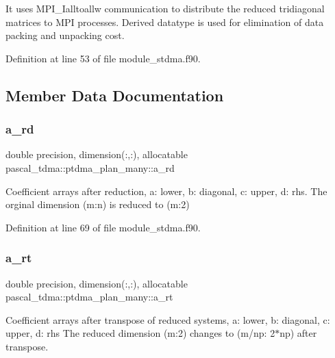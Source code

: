 It uses M\+P\+I\+\_\+\+Ialltoallw communication to distribute the reduced tridiagonal matrices to M\+PI processes. Derived datatype is used for elimination of data packing and unpacking cost. 

Definition at line 53 of file module\+\_\+stdma.\+f90.



\subsection{Member Data Documentation}
\mbox{\label{structpascal__tdma_1_1ptdma__plan__many_a6d9101716eca623dc8c45075788f06bd}} 
\subsubsection{\texorpdfstring{a\_rd}{a\_rd}}
{\footnotesize\ttfamily double precision, dimension(\+:,\+:), allocatable pascal\+\_\+tdma\+::ptdma\+\_\+plan\+\_\+many\+::a\+\_\+rd}



Coefficient arrays after reduction, a\+: lower, b\+: diagonal, c\+: upper, d\+: rhs. The orginal dimension (m\+:n) is reduced to (m\+:2) 



Definition at line 69 of file module\+\_\+stdma.\+f90.

\mbox{\label{structpascal__tdma_1_1ptdma__plan__many_a42be039aee75c5393c22111cf232e77d}} 
\subsubsection{\texorpdfstring{a\_rt}{a\_rt}}
{\footnotesize\ttfamily double precision, dimension(\+:,\+:), allocatable pascal\+\_\+tdma\+::ptdma\+\_\+plan\+\_\+many\+::a\+\_\+rt}



Coefficient arrays after transpose of reduced systems, a\+: lower, b\+: diagonal, c\+: upper, d\+: rhs The reduced dimension (m\+:2) changes to (m/np\+: 2$\ast$np) after transpose. 




